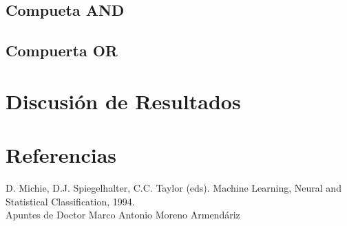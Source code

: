 \documentclass{article}
\begin{document}
\subsection{Compueta AND}
\subsection{Compuerta OR}
\section{Discusión de Resultados}
\section{Referencias}
D. Michie, D.J. Spiegelhalter, C.C. Taylor (eds). Machine Learning, Neural and Statistical Classification, 1994.\\
Apuntes de Doctor Marco Antonio Moreno Armendáriz
\end{document}
